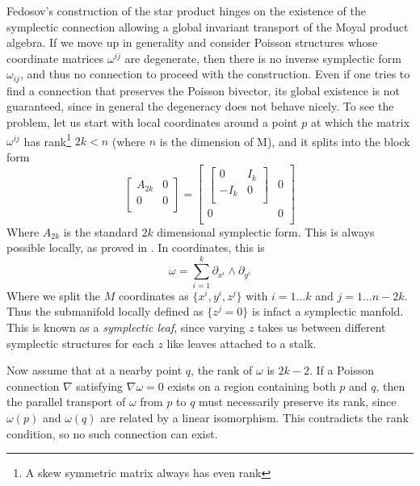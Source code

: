 \documentclass[
  12pt,
  a4paper, oneside
]{report}
\theoremstyle{bolddef}
\theoremstyle{remark}
\numberwithin{equation}{chapter}
\begin{document}
Fedosov's construction of the star product hinges on the existence of the symplectic connection allowing a global invariant transport of the Moyal product algebra. If we move up in generality and consider Poisson structures whose coordinate matrices $\omega^{ij}$ are degenerate, then there is no inverse symplectic form $\omega_{ij}$, and thus no connection to proceed with the construction. Even if one tries to find a connection that preserves the Poisson bivector, its global existence is not guaranteed, since in general the degeneracy does not behave nicely. To see the problem, let us start with local coordinates around a point $p$ at which the matrix $\omega^{ij}$ has rank\footnote{A skew symmetric matrix always has even rank} $2k < n$ (where $n$ is the dimension of M), and it splits into the block form
\begin{equation}
  \begin{bmatrix}
  A_{2k} & 0 \\
  0 & 0 \\
  \end{bmatrix} = 
  \begin{bmatrix}
  \begin{bmatrix}
  0 & I_{k} \\
  -I_{k} & 0 \\
  \end{bmatrix} & 0 \\
  0 & 0 \\
  \end{bmatrix}
\end{equation}
Where $A_{2k}$ is the standard $2k$ dimensional symplectic form. This is always possible locally, as proved in \cite{CannasdaSilva2001}. In coordinates, this is 
$$
\omega = \sum_{i=1}^{k} \partial_{x^{i}} \wedge \partial_{y^{i}}
$$
Where we split the $M$ coordinates as $\{ x^{i}, y^{i},z^{j}\}$ with $i = 1 \ldots k$ and $j = 1 \ldots n-2k$. Thus the submanifold locally defined as $\{z^{j} = 0\}$ is infact a symplectic manfold. This is known as a \textit{symplectic leaf}, since varying $z$ takes us between different symplectic structures for each $z$ like leaves attached to a stalk. 



Now assume that at a nearby point $q$, the rank of $\omega$ is $2k-2$. If a Poisson connection $\nabla$ satisfying $\nabla\omega = 0$ exists on a region containing both $p$ and $q$, then the parallel transport of $\omega$ from $p$ to $q$ must necessarily preserve its rank, since $\omega(p)$ and $\omega(q)$ are related by a linear isomorphism. This contradicts the rank condition, so no such connection can exist. 
\bigskip
\end{document}

